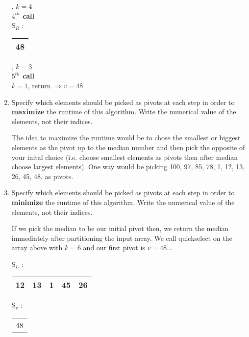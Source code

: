 \documentclass[11pt]{article}
\begin{document}
\begin{enumerate}
\begin{solution}
\begin{center}
            , $k = 4$\\
            \textbf{$4^{th}$ call}\\
            S$_R$ : 
            \begin{tabular}{|c|}
                \hline
                48\\ 
                \hline
            \end{tabular}
            , $k = 3$ \\
            \textbf{$5^{th}$ call}\\
            $k = 1$, return $\Rightarrow v=48$                                                
        \end{center}
    \end{solution}
    \newpage
    \item Specify which elements should be picked as pivots at each step in order to \textbf{maximize} the runtime of this algorithm. Write the numerical value of the elements, not their indices.\\
    \begin{solution}
        The idea to maximize the runtime would be to chose the smallest or biggest elements as the pivot up to the median number and then pick the opposite of your inital choice (i.e. choose smallest elements as pivots then after median choose largest elements).
        One way would be picking 100, 97, 85, 78, 1, 12, 13, 26, 45, 48, as pivots.
    \end{solution}
    \item Specify which elements should be picked as pivots at each step in order to \textbf{minimize} the runtime of this algorithm. Write the numerical value of the elements, not their indices.\\
    \begin{solution}
        If we pick the median to be our initial pivot then, we return the median immediately after partitioning the input array. 
        We call quickselect on the array above with $k = 6$ and our first pivot is $v = 48$...
        \begin{center}
            S$_L$ : 
            \begin{tabular}{|c|c|c|c|c|}
                \hline
                12 & 13 & 1 & 45 & 26\\ 
                \hline
            \end{tabular} \text{  }
            S$_v$ : 
            \begin{tabular}{|c|}
                \hline
                48\\ 

\end{tabular}
\end{center}
\end{solution}
\end{enumerate}
\end{document}

